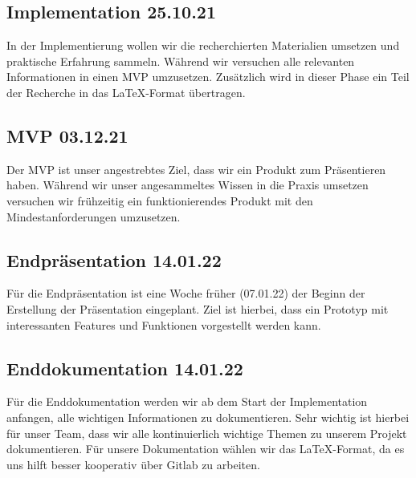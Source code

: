 \subsection{Implementation 25.10.21}
In der Implementierung wollen wir die recherchierten Materialien umsetzen und praktische Erfahrung sammeln.
Während wir versuchen alle relevanten Informationen in einen MVP umzusetzen. Zusätzlich wird in dieser Phase
ein Teil der Recherche in das \LaTeX-Format übertragen.

\subsection{MVP 03.12.21}
Der MVP ist unser angestrebtes Ziel, dass wir ein Produkt zum Präsentieren haben.
Während wir unser angesammeltes Wissen in die Praxis umsetzen versuchen wir
frühzeitig ein funktionierendes Produkt mit den Mindestanforderungen umzusetzen.

\subsection{Endpräsentation 14.01.22}
Für die Endpräsentation ist eine Woche früher (07.01.22) der Beginn der Erstellung der Präsentation eingeplant.
Ziel ist hierbei, dass ein Prototyp mit interessanten Features und Funktionen vorgestellt werden kann.

\subsection{Enddokumentation 14.01.22}
Für die Enddokumentation werden wir ab dem Start der Implementation anfangen, alle wichtigen Informationen zu dokumentieren.
Sehr wichtig ist hierbei für unser Team, dass wir alle kontinuierlich wichtige Themen zu unserem Projekt dokumentieren.
Für unsere Dokumentation wählen wir das \LaTeX-Format, da es uns hilft besser kooperativ über Gitlab zu arbeiten.
